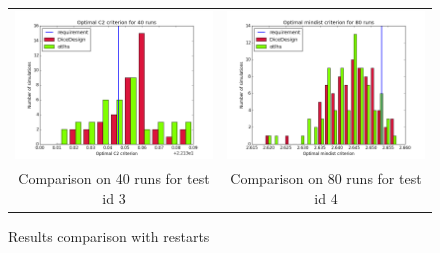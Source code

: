 \begin{figure}[!h]
\begin{center}
\begin{tabular}{cc}
 \includegraphics[scale=0.4]{comp_c2_large.png} & \includegraphics[scale=0.4]{comp_mindist_large.png}\\
 Comparison on 40 runs for test id 3 & Comparison on 80 runs for test id 4\\
\end{tabular}
\end{center}
\caption{Results comparison with restarts}
\label{comp_otlhs_dicedesign_tests}
\end{figure}

